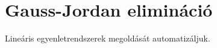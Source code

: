 \documentclass{memoir}
\begin{document}
\chapter{Gauss-Jordan elimináció}
Lineáris egyenletrendszerek megoldását automatizáljuk.
\end{document}
